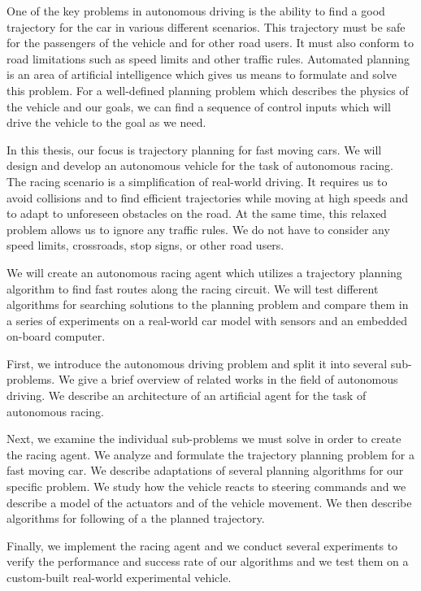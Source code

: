 One of the key problems in autonomous driving is the ability to find a good trajectory for the car in various different scenarios. This trajectory must be safe for the passengers of the vehicle and for other road users. It must also conform to road limitations such as speed limits and other traffic rules. Automated planning is an area of artificial intelligence which gives us means to formulate and solve this problem. For a well-defined planning problem which describes the physics of the vehicle and our goals, we can find a sequence of control inputs which will drive the vehicle to the goal as we need.

In this thesis, our focus is trajectory planning for fast moving cars. We will design and develop an autonomous vehicle for the task of autonomous racing. The racing scenario is a simplification of real-world driving. It requires us to avoid collisions and to find efficient trajectories while moving at high speeds and to adapt to unforeseen obstacles on the road. At the same time, this relaxed problem allows us to ignore any traffic rules. We do not have to consider any speed limits, crossroads, stop signs, or other road users.

We will create an autonomous racing agent which utilizes a trajectory planning algorithm to find fast routes along the racing circuit. We will test different algorithms for searching solutions to the planning problem and compare them in a series of experiments on a real-world car model with sensors and an embedded on-board computer.

First, we introduce the autonomous driving problem and split it into several sub-problems. We give a brief overview of related works in the field of autonomous driving. We describe an architecture of an artificial agent for the task of autonomous racing.

Next, we examine the individual sub-problems we must solve in order to create the racing agent. We analyze and formulate the trajectory planning problem for a fast moving car. We describe adaptations of several planning algorithms for our specific problem. We study how the vehicle reacts to steering commands and we describe a model of the actuators and of the vehicle movement. We then describe algorithms for following of a the planned trajectory.

Finally, we implement the racing agent and we conduct several experiments to verify the performance and success rate of our algorithms and we test them on a custom-built real-world experimental vehicle.
